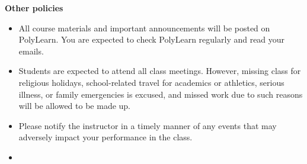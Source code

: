 \documentclass[letterpaper,12pt]{report}
\begin{document}
\textbf{Other policies}
\begin{itemize}
\item All course materials and important announcements will be posted on PolyLearn. You are expected to check PolyLearn regularly and read your emails.
\item Students are expected to attend all class meetings.  However, missing class for religious holidays, school-related travel for academics or athletics, serious illness, or family emergencies is excused, and missed work due to such reasons will be allowed to be made up.
\item Please notify the instructor in a timely manner of any events that may adversely impact your performance in the class.
\item[]
\end{itemize}
\end{document}
